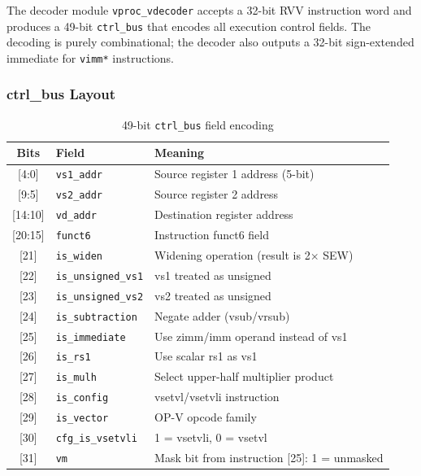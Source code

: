 The decoder module \texttt{vproc\_vdecoder} accepts a 32-bit RVV instruction word and
produces a 49-bit \texttt{ctrl\_bus} that encodes all execution control fields. The
decoding is purely combinational; the decoder also outputs a 32-bit sign-extended
immediate for \texttt{vimm*} instructions.

\subsubsection{ctrl\_bus Layout}

\begin{table}[H]
\centering
\caption{49-bit \texttt{ctrl\_bus} field encoding}
\label{tab:ctrlbus}
\begin{tabular}{clp{7cm}}
\toprule
\textbf{Bits} & \textbf{Field} & \textbf{Meaning} \\
\midrule
{[4:0]}   & \texttt{vs1\_addr}          & Source register 1 address (5-bit) \\
{[9:5]}   & \texttt{vs2\_addr}          & Source register 2 address \\
{[14:10]} & \texttt{vd\_addr}           & Destination register address \\
{[20:15]} & \texttt{funct6}             & Instruction funct6 field \\
{[21]}    & \texttt{is\_widen}          & Widening operation (result is 2$\times$ SEW) \\
{[22]}    & \texttt{is\_unsigned\_vs1}  & vs1 treated as unsigned \\
{[23]}    & \texttt{is\_unsigned\_vs2}  & vs2 treated as unsigned \\
{[24]}    & \texttt{is\_subtraction}    & Negate adder (vsub/vrsub) \\
{[25]}    & \texttt{is\_immediate}      & Use zimm/imm operand instead of vs1 \\
{[26]}    & \texttt{is\_rs1}            & Use scalar rs1 as vs1 \\
{[27]}    & \texttt{is\_mulh}           & Select upper-half multiplier product \\
{[28]}    & \texttt{is\_config}         & vsetvl/vsetvli instruction \\
{[29]}    & \texttt{is\_vector}         & OP-V opcode family \\
{[30]}    & \texttt{cfg\_is\_vsetvli}   & 1 = vsetvli, 0 = vsetvl \\
{[31]}    & \texttt{vm}                 & Mask bit from instruction [25]: 1 = unmasked \\

\end{tabular}
\end{table}
